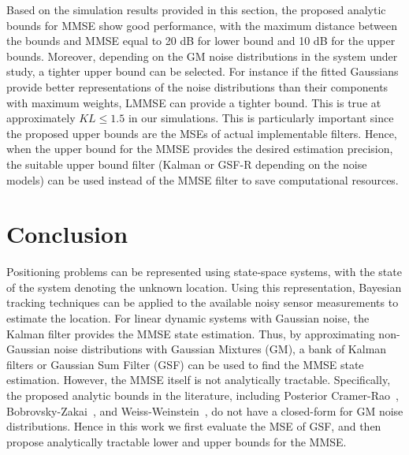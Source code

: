 \documentclass[10pt,twocolumn,twoside]{IEEEtran}
\newcommand{\corcol}[1]{\textcolor{CorCol}{#1}}
\begin{document}
Based on the simulation results provided in this section, the proposed analytic bounds for MMSE show good performance, with the maximum distance between the bounds and MMSE equal to 20 dB for lower bound and 10 dB for the upper bounds. Moreover, depending on the GM noise distributions in the system under study, a tighter upper bound can be selected. \corcol{For instance if the fitted Gaussians provide better representations of the noise distributions than their components with  maximum weights, LMMSE can provide a tighter bound. This is true at approximately \(KL \leq 1.5\) in our simulations.} This is particularly important since the proposed upper bounds are the MSEs of actual implementable filters. Hence, when the upper bound for the MMSE provides the desired estimation precision, the suitable upper bound filter (Kalman or GSF-R depending on the noise models) can be used instead of the MMSE filter to save computational resources.  
\section{Conclusion}
\label{sec:Conclusion}
Positioning problems can be represented using state-space systems, with the state of the system denoting the unknown location. Using this representation, Bayesian tracking techniques can be applied to the available noisy sensor measurements to estimate the location. For linear dynamic systems with Gaussian noise, \corcol{the }Kalman filter provides the MMSE state estimation. Thus, by approximating non-Gaussian  noise distributions with Gaussian Mixtures (GM), a bank of Kalman filters or Gaussian Sum Filter (GSF) can be used to find the MMSE state estimation. However, the MMSE itself is not analytically tractable. Specifically, the proposed analytic bounds in the literature, including Posterior Cramer-Rao~\cite{tichavsky_posterior_1998}, Bobrovsky-Zakai~\cite{bobrovsky_lower_1976}, and Weiss-Weinstein~\cite{weiss_lower_1985,xaver_analytic_2013}, do not have a closed-form for GM noise distributions. Hence in this work we first evaluate the MSE of GSF, and then propose analytically tractable lower and upper bounds for the MMSE.
\end{document}
